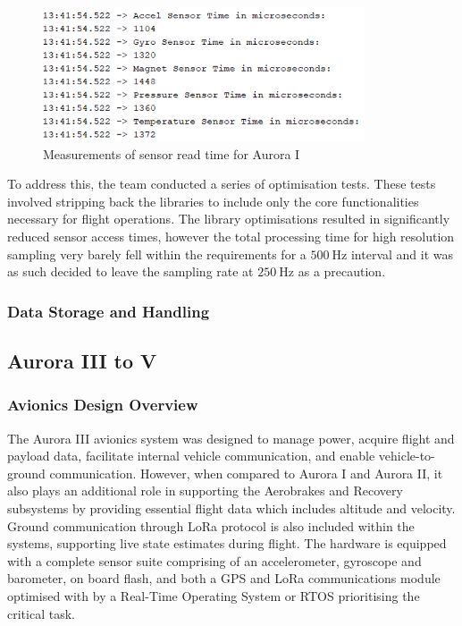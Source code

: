 \begin{figure}[h]
    \begin{center}
        \includegraphics[width=0.85\textwidth]{./img/sensor_timing-A1.png}
    \end{center}
    \caption{Measurements of sensor read time for Aurora I}\label{fig:sensor_timing-A1}
\end{figure}

To address this, the team conducted a series of optimisation tests. These tests involved stripping back the libraries to include only the core functionalities necessary for flight operations. The library optimisations resulted in significantly reduced sensor access times, however the total processing time for high resolution sampling very barely fell within the requirements for a $\qty{500}{\hertz}$ interval and it was as such decided to leave the sampling rate at $\qty{250}{\hertz}$ as a precaution.

\subsubsection{Data Storage and Handling}

\subsection{Aurora III to V}
\subsubsection{Avionics Design Overview}
The Aurora III avionics system was designed to manage power, acquire flight and payload data, facilitate internal vehicle communication, and enable vehicle-to-ground communication. However, when compared to Aurora I and Aurora II, it also plays an additional role in supporting the Aerobrakes and Recovery subsystems by providing essential flight data which includes altitude and velocity. Ground communication through LoRa protocol is also included within the systems, supporting live state estimates during flight. The hardware is equipped with a complete sensor suite comprising of an accelerometer, gyroscope and barometer, on board flash, and both a GPS and LoRa communications module optimised with by a Real-Time Operating System or RTOS prioritising the critical task.   

